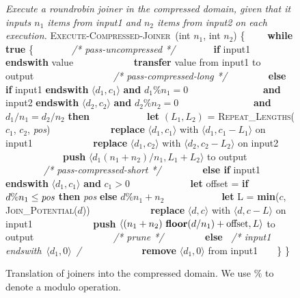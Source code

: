 \begin{figure}[t]
\centering
\vspace{-6pt}
\begin{minipage}{0.75\textwidth}
{\it Execute a roundrobin joiner in the compressed domain, given that
  it inputs $n_1$ items from input1 and $n_2$ items from input2 on
  each execution.}\mynewline
\textsc{Execute-Compressed-Joiner}~(int $n_1$, int $n_2$) \{\mynewline
\mbox{~~~~}{\bf while true} \{\mynewline \mbox{~~~~}\mbox{~~~~}{\it /*
  pass-uncompressed */}\mynewline \mbox{~~~~}\mbox{~~~~}{\bf if}
input1 {\bf endswith} value\mynewline
\mbox{~~~~}\mbox{~~~~}\mbox{~~~~}{\bf transfer} value from input1 to
output\mynewline \mbox{~~~~}\mbox{~~~~}\mynewline
\mbox{~~~~}\mbox{~~~~}{\it /* pass-compressed-long */}\mynewline
\mbox{~~~~}\mbox{~~~~}{\bf else if} input1 {\bf endswith} $\langle
d_1,c_1 \rangle$ {\bf and} $d_1\%n_1 = 0$\mynewline
\mbox{~~~~}\mbox{~~~~}\mbox{~~~~~~~}{\bf and} input2 {\bf endswith}
$\langle d_2,c_2 \rangle$ {\bf and} $d_2\%n_2 = 0$\mynewline
\mbox{~~~~}\mbox{~~~~}\mbox{~~~~~~~}{\bf and} $d_1/n_1 = d_2/n_2$ {\bf
  then}\mynewline \mbox{~~~~}\mbox{~~~~}\mbox{~~~~}{\bf let} $(L_1,
L_2)$ = \textsc{Repeat\_Lengths}($c_1$, $c_2$, {\it pos})\mynewline
\mbox{~~~~}\mbox{~~~~}\mbox{~~~~}{\bf replace} $\langle d_1, c_1
\rangle$ with $\langle d_1, c_1-L_1\rangle$ on input1\mynewline
\mbox{~~~~}\mbox{~~~~}\mbox{~~~~}{\bf replace} $\langle d_1, c_2
\rangle$ with $\langle d_2, c_2-L_2\rangle$ on input2\mynewline
\mbox{~~~~}\mbox{~~~~}\mbox{~~~~}{\bf push} $\langle d_1(n_1+n_2)/n_1,
L_1+L_2 \rangle$ to output\mynewline \mbox{~~~~}\mbox{~~~~}\mynewline
\mbox{~~~~}\mbox{~~~~}{\it /* pass-compressed-short */}\mynewline
\mbox{~~~~}\mbox{~~~~}{\bf else if} input1 {\bf endswith} $\langle
d_1,c_1 \rangle$ {\bf and} $c_1>0$\mynewline
\mbox{~~~~}\mbox{~~~~}\mbox{~~~~}{\bf let} offset = {\bf if} $d\%n_1
\leq \mbox{\it pos}$ {\bf then} {\it pos} {\bf else} $d\%n_1 +
n_2$\mynewline \mbox{~~~~}\mbox{~~~~}\mbox{~~~~}{\bf let} L = {\bf
  min}($c$, \textsc{Join\_Potential}($d$))\mynewline
\mbox{~~~~}\mbox{~~~~}\mbox{~~~~}{\bf replace} $\langle d, c\rangle$
with $\langle d, c - L\rangle$ on input1\mynewline
\mbox{~~~~}\mbox{~~~~}\mbox{~~~~}{\bf push} $\langle
(n_1+n_2)~\mbox{\bf floor}(d/n_1) + \mbox{offset}, L \rangle$ to
output\mynewline \mbox{~~~~}\mbox{~~~~}\mynewline
\mbox{~~~~}\mbox{~~~~}{\it /* prune */}\mynewline
\mbox{~~~~}\mbox{~~~~}{\bf else~} {\it /* input1 endswith}~$\langle
d_1, 0 \rangle$~{\it */}\mynewline
\mbox{~~~~}\mbox{~~~~}\mbox{~~~~}{\bf remove} $\langle d_1,0 \rangle$
from input1\mynewline \mbox{~~~~}\}\mynewline
\}\mynewline
\end{minipage}
\vspace{-6pt}
\caption[Translation of joiners into the compressed
  domain]{Translation of joiners into the compressed domain.  We use
  $\%$ to denote a modulo operation.
\protect\label{fig:translate-joiner}}
\end{figure}

